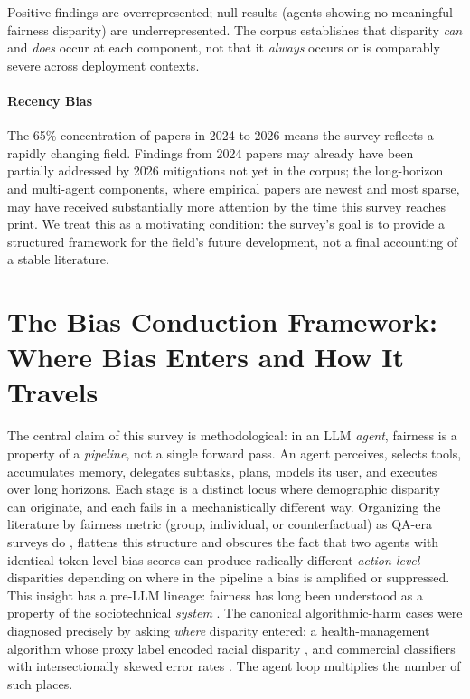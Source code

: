 \documentclass[acmsmall,nonacm]{acmart}
\begin{document}
Positive findings are overrepresented; null results (agents showing no meaningful fairness disparity) are underrepresented. The corpus establishes that disparity \emph{can} and \emph{does} occur at each component, not that it \emph{always} occurs or is comparably severe across deployment contexts.

\paragraph{Recency Bias}

The 65\% concentration of papers in 2024 to 2026 means the survey reflects a rapidly changing field. Findings from 2024 papers may already have been partially addressed by 2026 mitigations not yet in the corpus; the long-horizon and multi-agent components, where empirical papers are newest and most sparse, may have received substantially more attention by the time this survey reaches print. We treat this as a motivating condition: the survey's goal is to provide a structured framework for the field's future development, not a final accounting of a stable literature.

\section{The Bias Conduction Framework: Where Bias Enters and How It Travels}
\setcounter{subsection}{-1}

The central claim of this survey is methodological: in an LLM \emph{agent}, fairness is a property of a \emph{pipeline}, not a single forward pass. An agent perceives, selects tools, accumulates memory, delegates subtasks, plans, models its user, and executes over long horizons. Each stage is a distinct locus where demographic disparity can originate, and each fails in a mechanistically different way. Organizing the literature by fairness metric (group, individual, or counterfactual) as QA-era surveys do \cite{chu2024fairness,gallegos2024bias,navigli2023biases}, flattens this structure and obscures the fact that two agents with identical token-level bias scores can produce radically different \emph{action-level} disparities depending on where in the pipeline a bias is amplified or suppressed. This insight has a pre-LLM lineage: fairness has long been understood as a property of the sociotechnical \emph{system} \cite{selbst2019fairness}. The canonical algorithmic-harm cases were diagnosed precisely by asking \emph{where} disparity entered: a health-management algorithm whose proxy label encoded racial disparity \cite{obermeyer2019dissecting}, and commercial classifiers with intersectionally skewed error rates \cite{buolamwini2018gender}. The agent loop multiplies the number of such places.
\end{document}
